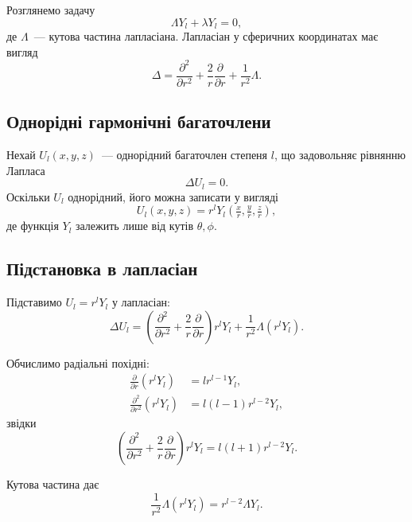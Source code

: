 \documentclass{article}
\begin{document}
\begin{tcolorbox}[vintagebox, title={\upshape\rule{4mm}{0.3pt}~~Виведення власних значень оператора $\Lambda$~~\rule{4mm}{0.3pt}}]

Розглянемо задачу
\begin{equation}
\Lambda Y_l + \lambda Y_l = 0,
\end{equation}
де $\Lambda$~--- кутова частина лапласіана.
Лапласіан у сферичних координатах має вигляд
\begin{equation}
\Delta = \frac{\partial^2}{\partial r^2}
+ \frac{2}{r}\frac{\partial}{\partial r}
+ \frac{1}{r^2}\Lambda.
\end{equation}

\subsection*{Однорідні гармонічні багаточлени}
Нехай $U_l(x,y,z)$~--- однорідний багаточлен степеня $l$, що задовольняє рівнянню Лапласа
\begin{equation}
\Delta U_l = 0.
\end{equation}
Оскільки $U_l$ однорідний, його можна записати у вигляді
\begin{equation}
U_l(x,y,z) = r^l Y_l\!\left(\tfrac{x}{r},\tfrac{y}{r},\tfrac{z}{r}\right),
\end{equation}
де функція $Y_l$ залежить лише від кутів $\theta,\phi$.

\subsection*{Підстановка в лапласіан}
Підставимо $U_l = r^l Y_l$ у лапласіан:
\begin{equation}
\Delta U_l =
\left( \frac{\partial^2}{\partial r^2}
+ \frac{2}{r}\frac{\partial}{\partial r} \right) r^l Y_l
+ \frac{1}{r^2}\Lambda(r^l Y_l).
\end{equation}

Обчислимо радіальні похідні:
\begin{align}
\frac{\partial}{\partial r}(r^l Y_l) &= l r^{l-1} Y_l, \\
\frac{\partial^2}{\partial r^2}(r^l Y_l) &= l(l-1) r^{l-2} Y_l,
\end{align}
звідки
\begin{equation}
\left( \frac{\partial^2}{\partial r^2}
+ \frac{2}{r}\frac{\partial}{\partial r} \right) r^l Y_l
= l(l+1) r^{l-2} Y_l.
\end{equation}

Кутова частина дає
\begin{equation}
\frac{1}{r^2}\Lambda(r^l Y_l) = r^{l-2}\Lambda Y_l.
\end{equation}


\end{tcolorbox}
\end{document}
